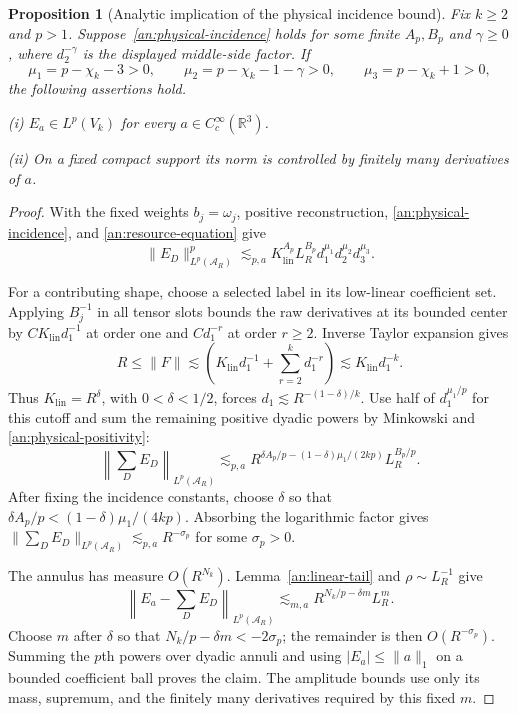 \documentclass[11pt]{amsart}
\makeatletter
\newtheorem{proposition}[theorem]{Proposition}
\theoremstyle{definition}
\theoremstyle{remark}
\numberwithin{equation}{section}
\newcommand{\equationalias}[1]{\begingroup\protected@edef\@currentlabel{\p@equation\theequation}\protected@edef\@currentHref{equation.\theHequation}\label{#1}\endgroup}
\makeatother
\begin{document}
\begin{proposition}[Analytic implication of the physical incidence bound]\label{an:physical-assembly}
Fix $k\ge2$ and $p>1$. Suppose~\eqref{an:physical-incidence} holds for some finite $A_p,B_p$ and $\gamma\ge0$, where $d_2^{-\gamma}$ is the displayed middle-side factor. If
\begin{equation}\label{an:physical-positivity}
\mu_1=p-\chi_k-3>0,\qquad \mu_2=p-\chi_k-1-\gamma>0,\qquad \mu_3=p-\chi_k+1>0,
\end{equation}
the following assertions hold.

\noindent\textup{(i)} $E_a\in L^p(V_k)$ for every $a\in C_c^\infty(\mathbb R^3)$.

\noindent\textup{(ii)} On a fixed compact support its norm is controlled by finitely many derivatives of $a$.
\end{proposition}
\begin{proof}
With the fixed weights $b_j=\omega_j$, positive reconstruction, \eqref{an:physical-incidence}, and \eqref{an:resource-equation} give
\begin{equation}\label{an:shape-estimate}
\|E_D\|_{L^p(\mathcal A_R)}^p\lesssim_{p,a} K_{\mathrm{lin}}^{A_p}L_R^{B_p}d_1^{\mu_1}d_2^{\mu_2}d_3^{\mu_3}.
\end{equation}
\equationalias{low:4:pf:final-shape}\equationalias{low:5:qpf:final-shape}

For a contributing shape, choose a selected label in its low-linear coefficient set. Applying $B_j^{-1}$ in all tensor slots bounds the raw derivatives at its bounded center by $CK_{\mathrm{lin}}d_1^{-1}$ at order one and $Cd_1^{-r}$ at order $r\ge2$. Inverse Taylor expansion gives
\begin{equation}\label{an:annular-shortness}
R\le\|F\|\lesssim \left(K_{\mathrm{lin}}d_1^{-1}+\sum_{r=2}^kd_1^{-r}\right)\lesssim K_{\mathrm{lin}}d_1^{-k}.
\end{equation}
Thus $K_{\mathrm{lin}}=R^\delta$, with $0<\delta<1/2$, forces $d_1\lesssim R^{-(1-\delta)/k}$. Use half of $d_1^{\mu_1/p}$ for this cutoff and sum the remaining positive dyadic powers by Minkowski and \eqref{an:physical-positivity}:
\[
\left\|\sum_D E_D\right\|_{L^p(\mathcal A_R)}\lesssim_{p,a} R^{\delta A_p/p-(1-\delta)\mu_1/(2kp)}L_R^{B_p/p}.
\]
After fixing the incidence constants, choose $\delta$ so that $\delta A_p/p<(1-\delta)\mu_1/(4kp)$. Absorbing the logarithmic factor gives $\|\sum_D E_D\|_{L^p(\mathcal A_R)}\lesssim_{p,a} R^{-\sigma_p}$ for some $\sigma_p>0$.

The annulus has measure $O(R^{N_k})$. Lemma~\ref{an:linear-tail} and $\rho\sim L_R^{-1}$ give
\[
\left\|E_a-\sum_D E_D\right\|_{L^p(\mathcal A_R)}\lesssim_{m,a} R^{N_k/p-\delta m}L_R^m.
\]
Choose $m$ after $\delta$ so that $N_k/p-\delta m<-2\sigma_p$; the remainder is then $O(R^{-\sigma_p})$. Summing the $p$th powers over dyadic annuli and using $|E_a|\le\|a\|_1$ on a bounded coefficient ball proves the claim. The amplitude bounds use only its mass, supremum, and the finitely many derivatives required by this fixed $m$.
\end{proof}
\end{document}
